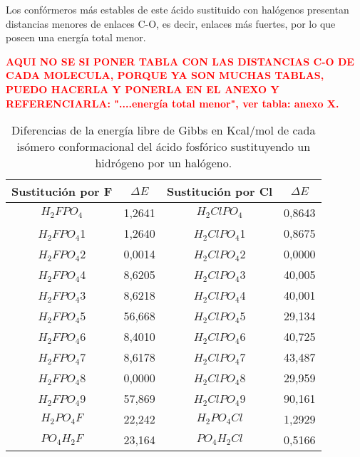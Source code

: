 Los confórmeros más estables de este ácido sustituido con halógenos presentan distancias menores de enlaces C-O, es decir, enlaces más fuertes, por lo que poseen una energía total menor.

{\bfseries\textcolor{red} {AQUI NO SE SI PONER TABLA CON LAS DISTANCIAS C-O DE CADA MOLECULA, PORQUE YA SON MUCHAS TABLAS, PUEDO HACERLA Y PONERLA EN EL ANEXO Y REFERENCIARLA: "....energía total menor", ver tabla: anexo X.}}
\begin{table}[H]
\begin{center}
\begin{tabular}{|c|c|c|c|}
\hline
Sustitución por F & $\Delta E$ & Sustitución por Cl & $\Delta E$ \\ \hline
$H_2FPO_4$& 1,2641 & $H_2ClPO_4$ & 0,8643 \\ \hline
$H_2FPO_4$1 & 1,2640 & $H_2ClPO_4$1 & 0,8675 \\ \hline
$H_2FPO_4$2 & 0,0014 & $H_2ClPO_4$2 & 0,0000 \\ \hline
$H_2FPO_4$4	& 8,6205 & $H_2ClPO_4$3 & 40,005 \\ \hline
$H_2FPO_4$3	& 8,6218 & $H_2ClPO_4$4 & 40,001 \\ \hline
$H_2FPO_4$5	& 56,668 & $H_2ClPO_4$5 & 29,134 \\ \hline
$H_2FPO_4$6	& 8,4010 & $H_2ClPO_4$6 & 40,725 \\ \hline
$H_2FPO_4$7	& 8,6178 & $H_2ClPO_4$7 & 43,487 \\ \hline
$H_2FPO_4$8	& 0,0000 & $H_2ClPO_4$8 & 29,959 \\ \hline
$H_2FPO_4$9	& 57,869 & $H_2ClPO_4$9 & 90,161 \\ \hline
$H_2PO_4F$ & 22,242 & $H_2PO_4Cl$ & 1,2929 \\ \hline
$PO_4H_2F$ & 23,164 & $PO_4H_2Cl$ & 0,5166 \\ \hline
\end{tabular}
\caption{Diferencias de la energía libre de Gibbs en Kcal/mol de cada isómero conformacional del ácido fosfórico sustituyendo un hidrógeno por un halógeno.}
\end{center}
\end{table}

